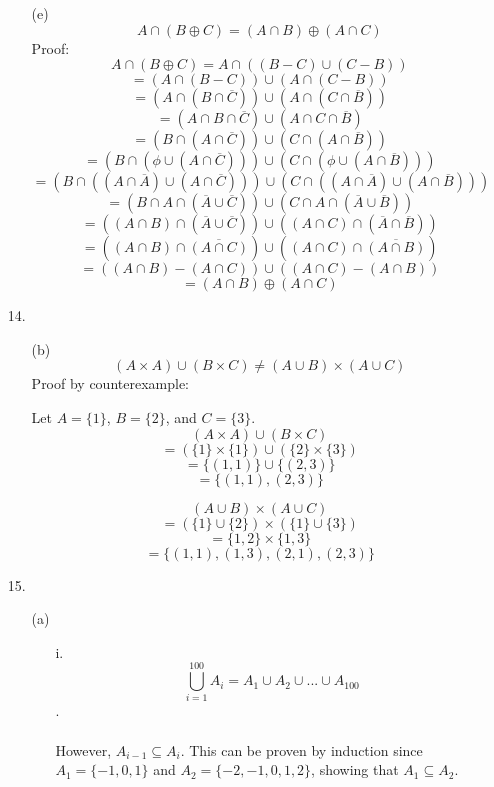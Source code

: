 \documentclass{article}
\begin{document}
\begin{enumerate}
\begin{enumerate}
			\item[(e)]
				\[A \cap (B \oplus C) = (A \cap B) \oplus (A \cap C)\]
				Proof:
				\[A \cap (B \oplus C) = A \cap ((B - C) \cup (C - B))\]
				\[= (A \cap (B - C)) \cup (A \cap (C - B))\]
				\[= (A \cap (B \cap \overline{C})) \cup (A \cap (C \cap \overline{B}))\]
				\[= (A \cap B \cap \overline{C}) \cup (A \cap C \cap \overline{B})\]
				\[= (B \cap (A \cap \overline{C})) \cup (C \cap (A \cap \overline{B}))\]
				\[= (B \cap (\phi \cup (A \cap \overline{C}))) \cup (C \cap (\phi \cup (A \cap \overline{B})))\]
				\[= (B \cap ((A \cap \overline{A}) \cup (A \cap \overline{C}))) \cup (C \cap ((A \cap \overline{A}) \cup (A \cap \overline{B})))\]
				\[= (B \cap A \cap (\overline{A} \cup \overline{C})) \cup (C \cap A \cap (\overline{A} \cup \overline{B}))\]
				\[= ((A \cap B) \cap (\overline{A} \cup \overline{C})) \cup ((A \cap C) \cap (\overline{A} \cap \overline{B}))\]
				\[= ((A \cap B) \cap \overline{(A \cap C)}) \cup ((A \cap C) \cap \overline{(A \cap B)})\]
				\[= ((A \cap B) - (A \cap C)) \cup ((A \cap C) - (A \cap B))\]
				\[= (A \cap B) \oplus (A \cap C)\]
		\end{enumerate}

	\item[14.]
		\begin{enumerate}
			\item[(b)]
				\[(A \times A) \cup (B \times C) \not= (A \cup B) \times (A \cup C)\]
				Proof by counterexample: 
				
				Let \(A = \{1\}\), \(B = \{2\}\), and \(C = \{3\}\).
				\[(A \times A) \cup (B \times C)\]
				\[= (\{1\} \times \{1\}) \cup (\{2\} \times \{3\})\]
				\[= \{(1, 1)\} \cup \{(2, 3)\}\]
				\[= \{(1, 1), (2, 3)\}\]
				
				\[(A \cup B) \times (A \cup C)\]
				\[= (\{1\} \cup \{2\}) \times (\{1\} \cup \{3\})\]
				\[= \{1, 2\} \times \{1, 3\}\]
				\[= \{(1, 1), (1, 3), (2, 1), (2, 3)\}\]
		\end{enumerate}

	\item[15.]
		\begin{enumerate}
			\item[(a)]
				\begin{enumerate}
					\item[i.]
						\[\bigcup_{i=1}^{100}A_{i} = A_{1} \cup A_{2} \cup ... \cup A_{100}\]. 

						\paragraph{}
						However, \(A_{i-1} \subseteq A_{i}\). This can be proven by induction since \(A_{1} = \{-1, 0, 1\}\) and \(A_{2} = \{-2, -1, 0, 1, 2\}\), showing that \(A_{1} \subseteq A_{2}\).
						

\end{enumerate}
\end{enumerate}
\end{enumerate}
\end{document}
